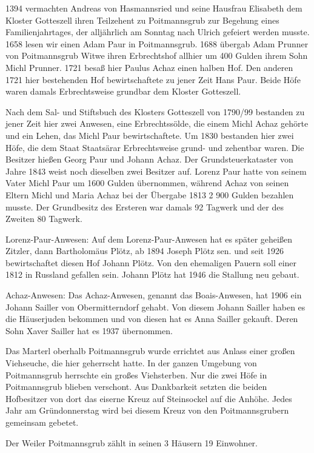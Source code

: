 \documentclass{book}
\begin{document}
1394 vermachten Andreas von Hasmannsried und seine Hausfrau Elisabeth dem
Kloster Gotteszell ihren Teilzehent zu Poitmannsgrub zur Begehung eines
Familienjahrtages, der alljährlich am Sonntag nach Ulrich gefeiert werden
musste. 1658 lesen wir einen Adam Paur in Poitmannsgrub. 1688 übergab Adam
Prunner von Poitmannsgrub Witwe ihren Erbrechtshof allhier um 400 Gulden ihrem
Sohn Michl Prunner. 1721 besaß hier Paulus Achaz einen halben Hof. Den anderen
1721 hier bestehenden Hof bewirtschaftete zu jener Zeit Hans Paur. Beide Höfe
waren damals Erbrechtsweise grundbar dem Kloster Gotteszell.

Nach dem Sal- und Stiftsbuch des Klosters Gotteszell von 1790/99 bestanden zu
jener Zeit hier zwei Anwesen, eine Erbrechtssölde, die einem Michl Achaz gehörte
und ein Lehen, das Michl Paur bewirtschaftete. Um 1830 bestanden hier zwei Höfe,
die dem Staat Staatsärar Erbrechtsweise grund- und zehentbar waren. Die Besitzer
hießen Georg Paur und Johann Achaz. Der Grundsteuerkataster von Jahre 1843 weist
noch dieselben zwei Besitzer auf. Lorenz Paur hatte von seinem Vater Michl Paur
um 1600 Gulden übernommen, während Achaz von seinen Eltern Michl und Maria Achaz
bei der Übergabe 1813 2 900 Gulden bezahlen musste. Der Grundbesitz des Ersteren
war damals 92 Tagwerk und der des Zweiten 80 Tagwerk.

Lorenz-Paur-Anwesen: Auf dem Lorenz-Paur-Anwesen hat es später geheißen Zitzler,
dann Bartholomäus Plötz, ab 1894 Joseph Plötz sen. und seit 1926 bewirtschaftet
diesen Hof Johann Plötz. Von den ehemaligen Pauern soll einer 1812 in Russland
gefallen sein. Johann Plötz hat 1946 die Stallung neu gebaut.

Achaz-Anwesen: Das Achaz-Anwesen, genannt das Boais-Anwesen, hat 1906 ein Johann
Sailler von Obermitterndorf gehabt. Von diesem Johann Sailler haben es die
Häuserjuden bekommen und von diesen hat es Anna Sailler gekauft. Deren Sohn
Xaver Sailler hat es 1937 übernommen.

Das Marterl oberhalb Poitmannsgrub wurde errichtet aus Anlass einer großen
Viehseuche, die hier geherrscht hatte. In der ganzen Umgebung von Poitmannsgrub
herrschte ein großes Viehsterben. Nur die zwei Höfe in Poitmannsgrub blieben
verschont. Aus Dankbarkeit setzten die beiden Hofbesitzer von dort das eiserne
Kreuz auf Steinsockel auf die Anhöhe. Jedes Jahr am Gründonnerstag wird bei
diesem Kreuz von den Poitmannsgrubern gemeinsam gebetet.

Der Weiler Poitmannsgrub zählt in seinen 3 Häusern 19 Einwohner.
\end{document}
